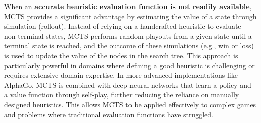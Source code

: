 \begin{itemize}
When an \textbf{accurate heuristic evaluation function is not readily available}, MCTS provides a significant advantage by estimating the value of a state through simulation (rollout). Instead of relying on a handcrafted heuristic to evaluate non-terminal states, MCTS performs random playouts from a given state until a terminal state is reached, and the outcome of these simulations (e.g., win or loss) is used to update the value of the nodes in the search tree. This approach is particularly powerful in domains where defining a good heuristic is challenging or requires extensive domain expertise. In more advanced implementations like AlphaGo, MCTS is combined with deep neural networks that learn a policy and a value function through self-play, further reducing the reliance on manually designed heuristics. This allows MCTS to be applied effectively to complex games and problems where traditional evaluation functions have struggled.
\end{itemize}